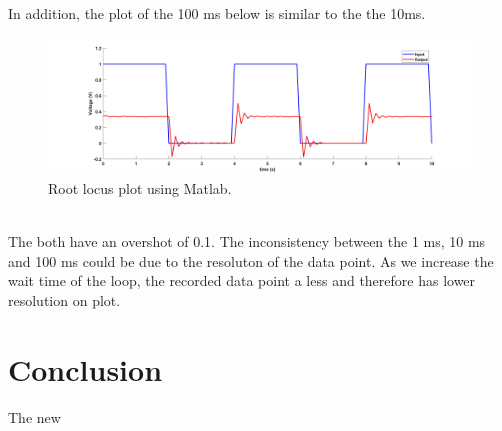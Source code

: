 \documentclass[12pt,letterpaper]{article}
\begin{document}
In addition, the plot of the 100 ms below is similar to the the 10ms.\\
\begin{figure}[h]
    \centering
    \includegraphics[width=15cm]{expstepin100.jpg}
    \caption{Root locus plot using Matlab.}
\end{figure}\\
The both have an overshot of 0.1. The inconsistency between the 1 ms, 10 ms and 100 ms 
could be due to the resoluton of the data point. As we increase the wait time of the loop,
the recorded data point a less and therefore has lower resolution on plot.
\section*{Conclusion}
The new 
\end{document}
